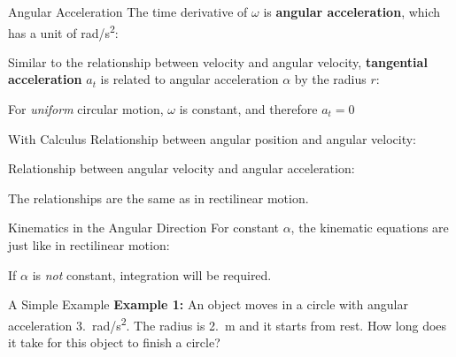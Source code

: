 \documentclass[12pt,compress,aspectratio=169]{beamer}
\newcommand{\eq}[2]{\vspace{#1}{\Large\begin{displaymath}#2\end{displaymath}}}
\begin{document}
\begin{frame}{Angular Acceleration}
  The time derivative of $\omega$ is \textbf{angular acceleration}, which
  has a unit of \si{rad/\second^2}:

  \eq{-.2in}{
    \alpha=\dot{\omega}=\ddot{\theta}
  }

  Similar to the relationship between velocity and angular velocity,
  \textbf{tangential acceleration} $a_t$ is related to angular acceleration
  $\alpha$ by the radius $r$:
    
  \eq{-.2in}{
    a_t(t)=\dot{v}=r\dot{\omega}=r\alpha
  }
    
  For \emph{uniform} circular motion, $\omega$ is constant, and therefore
  $a_t=0$
\end{frame}



\begin{frame}{With Calculus}
  Relationship between angular position and angular velocity:

  \eq{-.2in}{
    \omega(t)=\diff{\theta}t\quad\quad
    \theta(t)=\int\omega(t)\dl t +\theta_0
  }

  Relationship between angular velocity and angular acceleration:

  \eq{-.2in}{
    \alpha(t)=\diff{\omega}t=\diff[2]{\theta}t
    \quad\quad\omega(t)=\int\alpha(t)\dl t+\omega_0
  }

  The relationships are the same as in rectilinear motion.
\end{frame}




\begin{frame}{Kinematics in the Angular Direction}
  For constant $\alpha$, the kinematic equations are just like in rectilinear
  motion:

  
  If $\alpha$ is \emph{not} constant, integration will be required.
\end{frame}



\begin{frame}{A Simple Example}
  \textbf{Example 1:} An object moves in a circle with angular acceleration
  \SI{3.}{rad/\s^2}. The radius is \SI{2.}{\metre} and it starts from rest. How
  long does it take for this object to finish a circle?
\end{frame}
\end{document}
